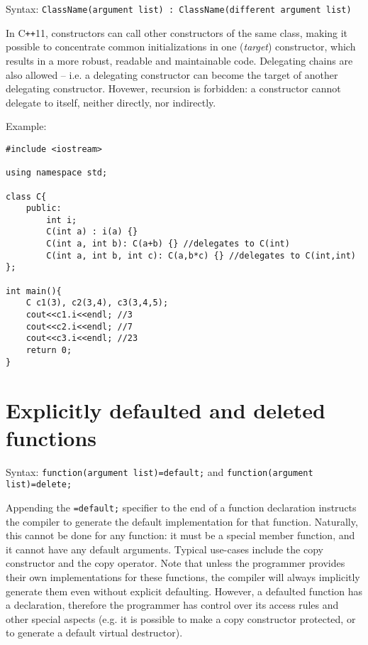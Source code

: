 \documentclass[12pt,a4paper]{article}
\begin{document}
Syntax: \lstinline[language=none]|ClassName(argument list) : ClassName(different argument list)|

In C\texttt{++}11, constructors can call other constructors of the same class, making it possible to concentrate common initializations in one (\emph{target}) constructor, which results in a more robust, readable and maintainable code. Delegating chains are also allowed -- i.e. a delegating constructor can become the target of another delegating constructor. Hovewer, recursion is forbidden: a constructor cannot delegate to itself, neither directly, nor indirectly.

\clearpage

Example:
\vspace{10pt}
\lstset{style=CPP_CODE}
\begin{lstlisting}
#include <iostream>

using namespace std;

class C{
    public:
        int i;
        C(int a) : i(a) {}
        C(int a, int b): C(a+b) {} //delegates to C(int)
        C(int a, int b, int c): C(a,b*c) {} //delegates to C(int,int)
};

int main(){
    C c1(3), c2(3,4), c3(3,4,5);
    cout<<c1.i<<endl; //3
    cout<<c2.i<<endl; //7
    cout<<c3.i<<endl; //23
    return 0;
}
\end{lstlisting}


\section{Explicitly defaulted and deleted functions}

Syntax: \lstinline[style=CPP_CODE]|function(argument list)=default;| and \lstinline[style=CPP_CODE]|function(argument list)=delete;|

Appending the \lstinline[style=CPP_CODE]|=default;| specifier to the end of a function declaration instructs the compiler to generate the default implementation for that function. Naturally, this cannot be done for any function: it must be a special member function, and it cannot have any default arguments. Typical use-cases include the copy constructor and the copy operator. Note that unless the programmer provides their own implementations for these functions, the compiler will always implicitly generate them even without explicit defaulting. However, a defaulted function has a declaration, therefore the programmer has control over its access rules and other special aspects (e.g. it is possible to make a copy constructor protected, or to generate a default virtual destructor).
\end{document}
